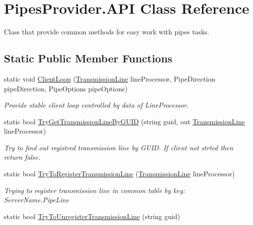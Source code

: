 \hypertarget{class_pipes_provider_1_1_a_p_i}{}\section{Pipes\+Provider.\+A\+PI Class Reference}
\label{class_pipes_provider_1_1_a_p_i}


Class that provide common methods for easy work with pipes\textquotesingle{} tasks.  


\subsection*{Static Public Member Functions}
\begin{DoxyCompactItemize}
\item 
static void \mbox{\hyperlink{class_pipes_provider_1_1_a_p_i_aaccf777b3b489b550739dd8adcf4a1d3}{Client\+Loop}} (\mbox{\hyperlink{class_pipes_provider_1_1_transmission_line}{Transmission\+Line}} line\+Processor, Pipe\+Direction pipe\+Direction, Pipe\+Options pipe\+Options)
\begin{DoxyCompactList}\small\item\em Provide stable client loop controlled by data of Line\+Processor. \end{DoxyCompactList}\item 
static bool \mbox{\hyperlink{class_pipes_provider_1_1_a_p_i_ae1abc16273a4b459fdbf63e68c44d11f}{Try\+Get\+Transmission\+Line\+By\+G\+U\+ID}} (string guid, out \mbox{\hyperlink{class_pipes_provider_1_1_transmission_line}{Transmission\+Line}} line\+Processor)
\begin{DoxyCompactList}\small\item\em Try to find out registred transmission line by G\+U\+ID. If client not strted then return false. \end{DoxyCompactList}\item 
static bool \mbox{\hyperlink{class_pipes_provider_1_1_a_p_i_a39e17f30d2ee8c716efeb92f947fb72e}{Try\+To\+Register\+Transmission\+Line}} (\mbox{\hyperlink{class_pipes_provider_1_1_transmission_line}{Transmission\+Line}} line\+Processor)
\begin{DoxyCompactList}\small\item\em Trying to register transmission line in common table by key\+: Server\+Name.\+Pipe\+Line \end{DoxyCompactList}\item 
static bool \mbox{\hyperlink{class_pipes_provider_1_1_a_p_i_ab0578d8470c97267dd9c6e2126cb69f0}{Try\+To\+Unregister\+Transmission\+Line}} (string guid)

\end{DoxyCompactItemize}
